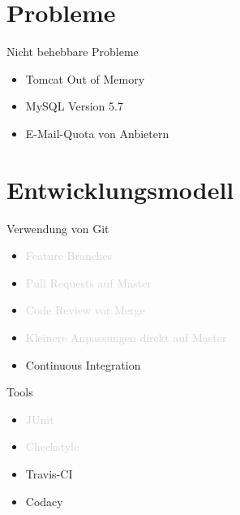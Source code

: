 \documentclass[xcolor=dvipsnames]{beamer}
\newcommand{\light}[1]{\textcolor{lightgray}{#1}}
\begin{document}
\section{Probleme}
\begin{frame}{Nicht behebbare Probleme}
\begin{itemize}
    \item Tomcat Out of Memory
    \item MySQL Version 5.7
    \item E-Mail-Quota von Anbietern
\end{itemize}
\end{frame}

\section{Entwicklungsmodell}
\begin{frame}{Verwendung von Git}
    \begin{itemize}
        \item \light{Feature Branches}
        \item \light{Pull Requests auf Master}
        \item \light{Code Review vor Merge}
        \item \light{Kleinere Anpassungen direkt auf Master}
        \item Continuous Integration
    \end{itemize}
\end{frame}

\begin{frame}{Tools}
    \begin{itemize}
        \item \light{JUnit}
        \item \light{Checkstyle}
        \item Travis-CI
        \item Codacy
    \end{itemize}
\end{frame}
\end{document}
